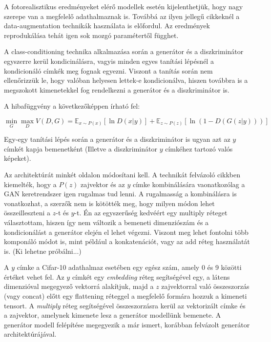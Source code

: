 A fotorealisztikus eredményeket elérő modellek esetén kijelenthetjük, hogy nagy szerepe van a megfelelő adathalmaznak is. Továbbá az ilyen jellegű cikkeknél a data-augmentation technikák használata is előfordul. Az eredmények reprodukálása tehát igen sok mozgó paramétertől függhet.

A class-conditioning technika alkalmazása során a generátor és a diszkriminátor egyszerre kerül kondicinálásra, vagyis minden egyes tanítási lépésnél a kondicionáló címkék meg fognak egyezni. Viszont a tanítás során nem ellenőrizzük le, hogy valóban helyesen lettek-e kondicionálva, hiszen továbbra is a megszokott kimenetekkel fog rendelkezni a generátor és a diszkriminátor is.

A hibafüggvény a következőképpen írható fel:

$$\min_{G}\max_{D}V(D, G) =  \mathbb{E}_{x \sim P(x)} \left[\ln D(x|y) \right] + \mathbb{E}_{z \sim P(z)} \left[\ln(1 - D(G(z|y))) \right]$$

Egy-egy tanítási lépés során a generátor és a diszkriminátor is ugyan azt az $y$ címkét kapja bemenetként (Illetve a diszkriminátor $y$ címkéhez tartozó valós képeket).

Az architektúrát minkét oldalon módosítani kell. A technikát felvázoló cikkben \cite{mirza2014conditional} kiemelték, hogy a $P(z)$ zajvektor és az $y$ címke kombinálására vaonatkozólag a GAN keretrendszer igen rugalmas tud lenni. A rugalmasság a kombinálásra is vonatkozhat, a szerzők nem is kötötték meg, hogy milyen módon lehet összeilleszteni a $z$-t és $y$-t. Én az egyszerűség kedvéért egy multiply réteget választottam, hiszen így nem változik a bemeneti dimenziószám és a kondicionálást a generátor elején el lehet végezni. Viszont meg lehet fontolni több komponáló módot is, mint például a konkatenációt, vagy az add réteg használatát is. (Ki lehetne próbálni...)

A $y$ címke a Cifar-10 adathalmaz esetében egy egész szám, amely 0 és 9 közötti értéket vehet fel. Az $y$ címkét egy \textit{embedding} réteg segítségével egy, a látens dimenzióval megegyező vektorrá alakítjuk, majd a $z$ zajvektorral való összeszorzás (vagy concat) előtt egy flattening réteggel a megfelelő formára hozzuk a kimeneti tensort.
A \textit{multiply} réteg segítségével összeszorzásra kerül az vektorizált címke és a zajvektor, amelynek kimenete lesz a generátor modellünk bemenete. A generátor modell felépítése megegyezik a már ismert, korábban felvázolt generátor architektúrájával. 

